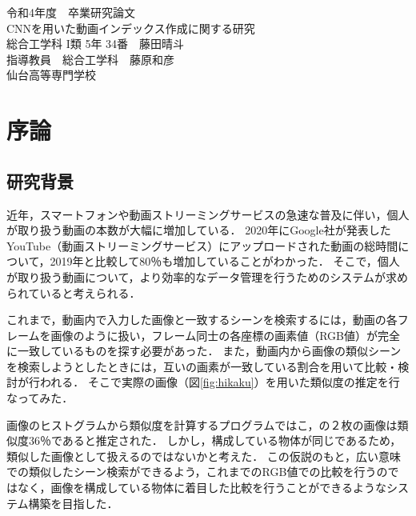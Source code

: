 \documentclass[a4j,12pt,dvipdfmx]{jreport}
\begin{document}
\begin{titlepage}
  \begin{center}
    {\large 令和4年度　卒業研究論文}\\
    \vspace{150truept}
    {\huge CNNを用いた動画インデックス作成に関する研究}\\
    \vspace{300truept}
    {\large 総合工学科 \textnormal{I}類 5年 34番　藤田晴斗}\\
    {\large 指導教員　総合工学科　藤原和彦}\\
    \vspace{30truept}
    {\large 仙台高等専門学校}\\
  \end{center}
\end{titlepage}

\tableofcontents
\clearpage

\chapter{序論}
\label{sec:introducion}

\section{研究背景}
近年，スマートフォンや動画ストリーミングサービスの急速な普及に伴い，個人が取り扱う動画の本数が大幅に増加している．
2020年にGoogle社が発表したYouTube（動画ストリーミングサービス）にアップロードされた動画の総時間について，2019年と比較して80％も増加していることがわかった\cite{google_data}．
そこで，個人が取り扱う動画について，より効率的なデータ管理を行うためのシステムが求められていると考えられる．

これまで，動画内で入力した画像と一致するシーンを検索するには，動画の各フレームを画像のように扱い，フレーム同士の各座標の画素値（RGB値）が完全に一致しているものを探す必要があった．
また，動画内から画像の類似シーンを検索しようとしたときには，互いの画素が一致している割合を用いて比較・検討が行われる．
そこで実際の画像（図\ref{fig:hikaku}）を用いた類似度の推定を行なってみた．

画像のヒストグラムから類似度を計算するプログラムではこ，の２枚の画像は類似度36％であると推定された．
しかし，構成している物体が同じであるため，類似した画像として扱えるのではないかと考えた．
この仮説のもと，広い意味での類似したシーン検索ができるよう，これまでのRGB値での比較を行うのではなく，画像を構成している物体に着目した比較を行うことができるようなシステム構築を目指した．
\end{document}
